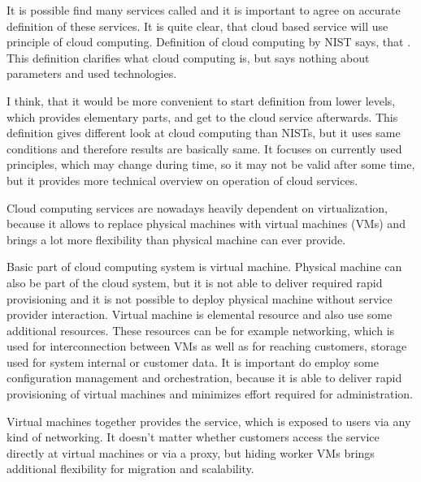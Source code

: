 
It is possible find many services called  and it is important to agree on accurate definition of these services. It is quite clear, that cloud based service will use principle of cloud computing. Definition of cloud computing by \Ac{NIST} says, that  \cite{cloud-definition}. This definition clarifies what cloud computing is, but says nothing about parameters and used technologies.

I think, that it would be more convenient to start definition from lower levels, which provides elementary parts, and get to the cloud service afterwards. This definition gives different look at cloud computing than \Ac{NIST}s, but it uses same conditions and therefore results are basically same. It focuses on currently used principles, which may change during time, so it may not be valid after some time, but it provides more technical overview on operation of cloud services.


Cloud computing services are nowadays heavily dependent on virtualization, because it allows to replace physical machines with virtual machines (\Ac{VM}s) and brings a lot more flexibility than physical machine can ever provide.

Basic part of cloud computing system is virtual machine. Physical machine can also be part of the cloud system, but it is not able to deliver required rapid provisioning and it is not possible to deploy physical machine without service provider interaction. Virtual machine is elemental resource and also use some additional resources. These resources can be for example networking, which is used for interconnection between \Ac{VM}s as well as for reaching customers, storage used for system internal or customer data. It is important do employ some configuration management and orchestration, because it is able to deliver rapid provisioning of virtual machines and minimizes effort required for administration.

Virtual machines together provides the service, which is exposed to users via any kind of networking. It doesn't matter whether customers access the service directly at virtual machines or via a proxy, but hiding worker \Ac{VM}s brings additional flexibility for migration and scalability. 

